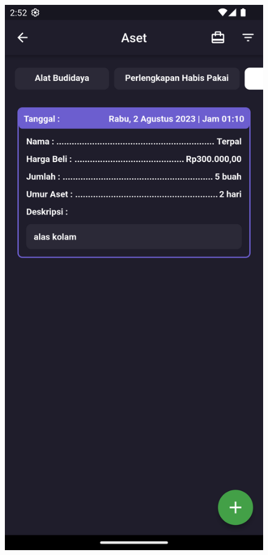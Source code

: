 \begin{spacing}{1.5}
\begin{enumerate}
\begin{enumerate}
\begin{itemize}
				\begin{figure}[H]
						\includegraphics[width=\linewidth]{gambar/sprint4/as_1.png}

\end{figure}
\end{itemize}
\end{enumerate}
\end{enumerate}
\end{spacing}
